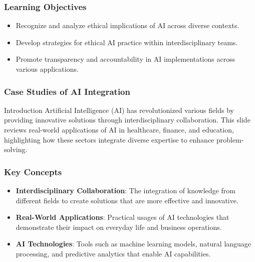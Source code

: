 \documentclass[aspectratio=169]{beamer}
\begin{document}
\begin{frame}[fragile]
    \frametitle{Learning Objectives}
    \begin{itemize}
        \item Recognize and analyze ethical implications of AI across diverse contexts.
        \item Develop strategies for ethical AI practice within interdisciplinary teams.
        \item Promote transparency and accountability in AI implementations across various applications.
    \end{itemize}
\end{frame}

\begin{frame}[fragile]
    \frametitle{Case Studies of AI Integration}
    \begin{block}{Introduction}
        Artificial Intelligence (AI) has revolutionized various fields by providing innovative solutions through interdisciplinary collaboration. This slide reviews real-world applications of AI in healthcare, finance, and education, highlighting how these sectors integrate diverse expertise to enhance problem-solving.
    \end{block}
\end{frame}

\begin{frame}[fragile]
    \frametitle{Key Concepts}
    \begin{itemize}
        \item \textbf{Interdisciplinary Collaboration}: The integration of knowledge from different fields to create solutions that are more effective and innovative.
        \item \textbf{Real-World Applications}: Practical usages of AI technologies that demonstrate their impact on everyday life and business operations.
        \item \textbf{AI Technologies}: Tools such as machine learning models, natural language processing, and predictive analytics that enable AI capabilities.
    \end{itemize}
\end{frame}
\end{document}
